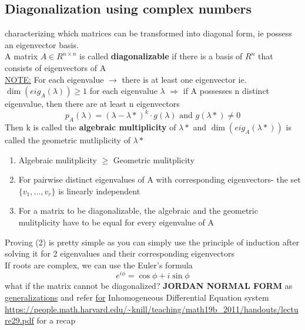 \documentclass{article}
\begin{document}
\subsection{Diagonalization using complex numbers} 
characterizing which matrices can be transformed into diagonal form, ie possess an eigenvector basis. \\
A matrix $A\in R^{n\times n}$ is called \textbf{diagonalizable} if there is a basis of $R^{n}$ that consists of eigenvectors of A\\[2pt]
\underline{NOTE:} For each eigenvalue $\rightarrow$ there is at least one eigenvector ie. $\dim(eig_A(\lambda)) \geq 1$ for each eigenvalue $\lambda$ 
$\Rightarrow$ if A possesses n distinct eigenvalue, then there are at least n eigenvectors \\
\begin{equation*} p_A(\lambda) = {(\lambda - \lambda*)}^k \cdot g(\lambda) \text{   and  } g(\lambda*) \neq 0 \end{equation*}
Then k is called the \textbf{algebraic multiplicity} of $\lambda*$ and $\dim(eig_A(\lambda*))$ is called the geometric mutliplicity of $\lambda*$
\begin{enumerate}
    \item Algebraic mulitplicity $\geq$ Geometric mulitplicity
    \item For pairwise distinct eigenvalues of A with corresponding eigenvectors- the set $\{v_1, \dots, v_r\}$ is linearly independent
    \item For a matrix to be diagonalizable, the algebraic and the geometric mulitplicity have to be equal for every eigenvalue of A 
\end{enumerate}
Proving (2) is pretty simple as you can simply use the principle of induction after solving it for 2 eigenvalues and their corresponding eigenvectors
\\ If roots are complex, we can use the Euler's formula \begin{equation*} e^{i \phi} = \cos\phi + i \sin \phi \end{equation*}
what if the matrix cannot be diagonalized? \textbf{JORDAN NORMAL FORM} as \href{https://en.wikipedia.org/wiki/Jordan_normal_form}{generalizations} and refer \href{https://shorturl.at/9Vxni}{for} Inhomogeneous Differential Equation system 
\\\url{https://people.math.harvard.edu/~knill/teaching/math19b_2011/handouts/lecture29.pdf} for a recap
\end{document}
